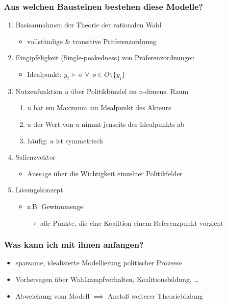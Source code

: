 \documentclass{beamer}
\begin{document}
\begin{frame}
  \frametitle{Aus welchen Bausteinen bestehen diese Modelle?}
  \begin{enumerate}
    \item Basisannahmen der Theorie der rationalen Wahl
    \begin{itemize}
      \item vollständige \& transitive Präferenzordnung
    \end{itemize}
    \item Eingipfeligkeit (Single-peakedness) von Präferenzordnungen
    \begin{itemize}
      \item Idealpunkt: $y_i \succ o ~~ \forall ~~ o \in O\setminus\{y_i\}$
    \end{itemize}
    \item Nutzenfunktion $u$ über Politikbündel im n-dimens. Raum
    \begin{enumerate}
      \item $u$ hat ein Maximum am Idealpunkt des Akteurs
      \item $u$ der Wert von $u$ nimmt jenseits des Idealpunkts ab
      \item häufig: $u$ ist symmetrisch
    \end{enumerate}
    \item Salienzvektor
    \begin{itemize}
      \item Aussage über die Wichtigkeit einzelner Politikfelder
    \end{itemize}
    \item Lösungskonzept
    \begin{itemize}
      \item z.B. Gewinnmenge
      \item [$\rightarrow$] alle Punkte, die eine Koalition einem Referenzpunkt vorzieht
    \end{itemize}
  \end{enumerate}
\end{frame}

\begin{frame}
  \frametitle{Was kann ich mit ihnen anfangen?}
  \begin{itemize}
    \item sparsame, idealisierte Modellierung politischer Prozesse
    \item Vorhersagen über Wahlkampfverhalten, Koalitionsbildung, \dots
    \item Abweichung vom Modell $\implies$ Anstoß weiterer Theoriebildung
  \end{itemize}
\end{frame}
\end{document}

